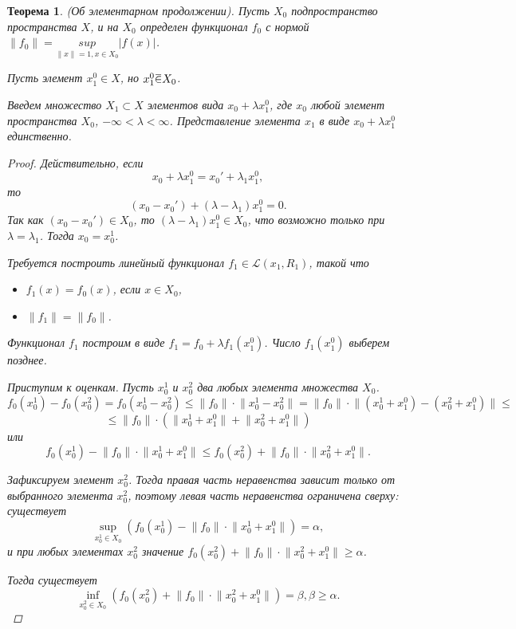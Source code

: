 \documentclass[12pt,a4paper,titlepage,oneside]{book}
\newcommand{\overbar}[1]{\mkern 1.5mu\overline{\mkern-1.5mu#1\mkern-1.5mu}\mkern 1.5mu}
\theoremstyle{definition}
\theoremstyle{plain}
\newtheorem*{theorem}{Теорема}
\theoremstyle{remark}
\theoremstyle{remark}
\theoremstyle{remark}
\theoremstyle{remark}
\theoremstyle{plain}
\theoremstyle{plain}
\begin{document}
\begin{theorem}(Об элементарном продолжении).
Пусть $X_0$ подпространство пространства $X$, и на $X_0$ определен функционал $f_0$ с нормой $\lVert f_0 \rVert = \underset{\lVert x \rVert=1, x \in X_0}{sup}|f(x)|$.

Пусть элемент $x_1^0 \in X$, но $x_1^0 \overbar{\in} X_0$.

Введем множество $X_1 \subset X$ элементов вида $x_0+\lambda x_1^0$, где $x_0$ любой элемент пространства $X_0$, $-\infty < \lambda < \infty$. Представление элемента $x_1$ в виде $x_0+\lambda x_1^0$ единственно.

\begin{proof}
Действительно, если $$x_0+\lambda x_1^0=x_0 '+\lambda_1 x_1^0,$$ то $$(x_0-x_0')+(\lambda-\lambda_1)x_1^0=0.$$
Так как $(x_0-x_0') \in X_0$, то $(\lambda-\lambda_1)x_1^0 \in X_0$, что возможно только при $\lambda=\lambda_1$. Тогда $x_0=x_0^1$.

Требуется построить линейный функционал $f_1 \in \mathcal{L}(x_1, R_1)$, такой что
\begin{itemize}
	\item $f_1(x)=f_0(x)$, если $x\in X_0$,
	\item $\lVert f_1 \rVert=\lVert f_0 \rVert$.
\end{itemize}

Функционал $f_1$ построим в виде $f_1=f_0+\lambda f_1(x_1^0)$. Число $f_1(x_1^0)$ выберем позднее.

Приступим к оценкам. Пусть $x_0^1$ и $x_0^2$ два любых элемента множества $X_0$.
$$f_0(x_0^1)-f_0(x_0^2)=f_0(x_0^1-x_0^2) \leqslant \lVert f_0 \rVert \cdot \lVert x_0^1-x_0^2 \rVert = \lVert f_0 \rVert \cdot \lVert (x_0^1+x_1^0)-(x_0^2+x_1^0) \rVert \leqslant$$
$$ \leqslant \lVert f_0 \rVert \cdot (\lVert x_0^1+x_1^0 \rVert + \lVert x_0^2+x_1^0 \rVert) $$
или
$$f_0(x_0^1)-\lVert f_0 \rVert \cdot \lVert x_0^1+x_1^0 \rVert \leqslant f_0(x_0^2)+\lVert f_0 \rVert \cdot \lVert x_0^2+x_1^0 \rVert.$$

Зафиксируем элемент $x_0^2$. Тогда правая часть неравенства зависит только от выбранного элемента $x_0^2$, поэтому левая часть неравенства ограничена сверху: существует
$$\underset{x_0^1 \in X_0}{\sup}\left( f_0(x_0^1)-\lVert f_0 \rVert \cdot \lVert x_0^1+x_1^0 \rVert \right)=\alpha,$$
и при любых элементах $x_0^2$ значение $f_0(x_0^2)+\lVert f_0 \rVert \cdot \lVert x_0^2+x_1^0 \rVert \geqslant \alpha$.

Тогда существует $$\underset{x_0^2 \in X_0}{\inf}\left(f_0(x_0^2)+\lVert f_0 \rVert \cdot \lVert x_0^2+x_1^0 \rVert \right)=\beta, \beta \geqslant  \alpha .$$


\end{proof}
\end{theorem}
\end{document}
